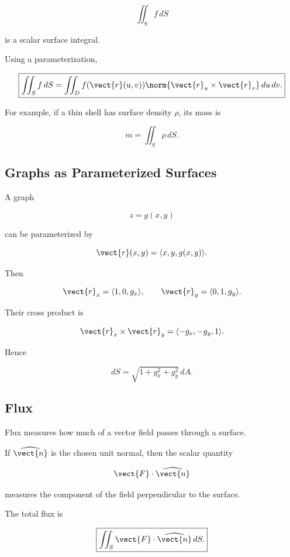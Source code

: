 \[ \iint_Sf\,dS \]

is a scalar surface integral.

Using a parameterization,

\[ \boxed{
\iint_Sf\,dS
=
\iint_D
f(\vect{r}(u,v))
\norm{\vect{r}_u\times\vect{r}_v}\,du\,dv.
} \]

For example, if a thin shell has surface density \(\rho\), its mass is

\[ m=\iint_S\rho\,dS. \]

\subsection{Graphs as Parameterized Surfaces}
\label{subsec:graphs-parameterized-surfaces}

A graph

\[ z=g(x,y) \]

can be parameterized by

\[ \vect{r}(x,y)=\langle x,y,g(x,y)\rangle. \]

Then

\[ \vect{r}_x=\langle1,0,g_x\rangle,
\qquad
\vect{r}_y=\langle0,1,g_y\rangle. \]

Their cross product is

\[ \vect{r}_x\times\vect{r}_y
=
\langle-g_x,-g_y,1\rangle. \]

Hence

\[ \boxed{dS=\sqrt{1+g_x^2+g_y^2}\,dA.} \]

\subsection{Flux}
\label{subsec:flux}

Flux measures how much of a vector field passes through a surface.

If \(\widehat{\vect{n}}\) is the chosen unit normal, then the scalar quantity

\[ \vect{F}\cdot\widehat{\vect{n}} \]

measures the component of the field perpendicular to the surface.

The total flux is

\[ \boxed{
\iint_S\vect{F}\cdot\widehat{\vect{n}}\,dS.
} \]


